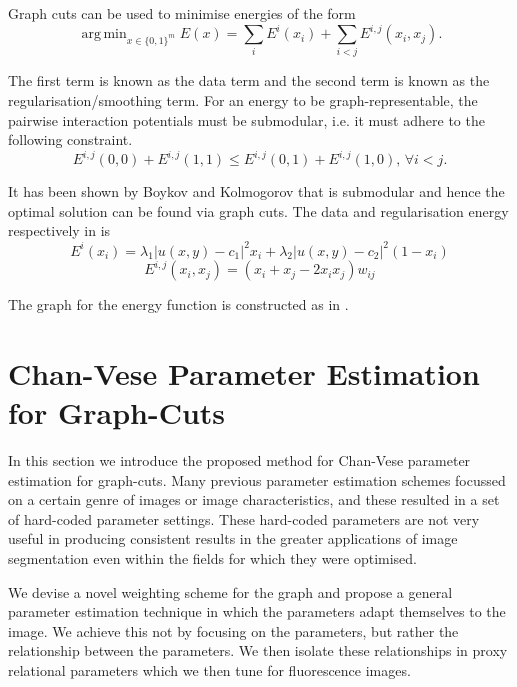 \documentclass[10pt, journal, letterpaper, onecolumn, draftcls]{IEEEtran}
\DeclareMathOperator*{\argmin}{arg\,min}
\begin{document}
Graph cuts can be used to minimise energies of the form
\begin{equation}
	\argmin_{x \in \{0,1\}^m}	E(x) = \sum_i E^i(x_i) + \sum_{i<j}E^{i,j}(x_i, x_j).
	\label{eq:graphcutenergyform}
\end{equation}

The first term is known as the data term and the second term is known as the regularisation/smoothing term. For an energy to be graph-representable, the pairwise interaction potentials must be submodular, i.e. it must adhere to the following constraint.
\begin{equation}
	E^{i,j}(0,0) + E^{i,j}(1,1) \leq E^{i,j}(0,1) + E^{i,j}(1,0), \, \forall i < j.
\end{equation}

It has been shown by Boykov and Kolmogorov \cite{Kolmogorov2004,Boykov2001_2,Boykvo2001_3,Kolmogorov2007} that  is submodular and hence the optimal solution can be found via graph cuts. The data and regularisation energy respectively in  is
\begin{equation}
	E^i(x_i) = \lambda_1 |u(x,y)-c_1|^2 x_i + \lambda_2 |u(x,y)-c_2|^2 (1-x_i)
\end{equation}
\begin{equation}
	E^{i,j}(x_i,x_j) = (x_i + x_j - 2x_ix_j)w_{ij}
\end{equation}

The graph for the energy function is constructed as in \cite{Kolmogorov2004}.

\section{Chan-Vese Parameter Estimation for Graph-Cuts}
\label{sec:Proptechnique}
In this section we introduce the proposed method for Chan-Vese \cite{ElZehiry2007} parameter estimation for graph-cuts. Many previous parameter estimation schemes focussed on a certain genre of images or image characteristics, and these resulted in a set of hard-coded parameter settings. These hard-coded parameters are not very useful in producing consistent results in the greater applications of image segmentation even within the fields for which they were optimised.

We devise a novel weighting scheme for the graph and propose a general parameter estimation technique in which the parameters adapt themselves to the image. We achieve this not by focusing on the parameters, but rather the relationship between the parameters. We then isolate these relationships in proxy relational parameters which we then tune for fluorescence images.
\end{document}
